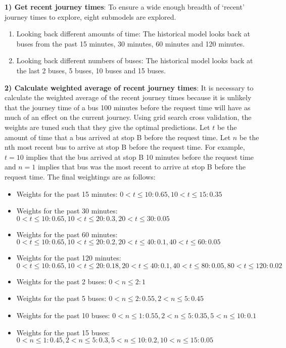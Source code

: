 \textbf{1) Get recent journey times}: To ensure a wide enough breadth of `recent' journey times to explore, eight submodels are explored.

\begin{enumerate}[label=(\alph*)]

\item Looking back different amounts of time: The historical model looks back at buses from the past 15 minutes, 30 minutes, 60 minutes and 120 minutes. 

\item Looking back different numbers of buses: The historical model looks back at the last 2 buses, 5 buses, 10 buses and 15 buses.

\end{enumerate}

\textbf{2) Calculate weighted average of recent journey times}: It is necessary to calculate the weighted average of the recent journey times because it is unlikely that the journey time of a bus 100 minutes before the request time will have as much of an effect on the current journey. Using grid search cross validation, the weights are tuned such that they give the optimal predictions. Let $t$ be the amount of time that a bus arrived at stop B before the request time. Let $n$ be the nth most recent bus to arrive at stop B before the request time. For example, $t = 10$ implies that the bus arrived at stop B 10 minutes before the request time and $n=1$ implies that bus was the most recent to arrive at stop B before the request time. The final weightings are as follows:

\begin{itemize}
    \item Weights for the past 15 minutes: $0 < t \leq 10: 0.65, 10 < t \leq 15: 0.35$
    \item Weights for the past 30 minutes: $0 < t \leq 10: 0.65, 10 < t \leq 20: 0.3, 20 < t \leq 30: 0.05$ 
    \item Weights for the past 60 minutes: $0 < t \leq 10: 0.65, 10 < t \leq 20: 0.2, 20 < t \leq 40: 0.1, 40 < t \leq 60: 0.05$ 
    \item Weights for the past 120 minutes:$0 < t \leq 10: 0.65, 10 < t \leq 20: 0.18, 20 < t \leq 40: 0.1, 40 < t \leq 80: 0.05, 80 < t \leq 120: 0.02$ 
    \item Weights for the past 2 buses: $0 < n \leq 2: 1$
    \item Weights for the past 5 buses: $0 < n \leq 2: 0.55, 2 < n \leq 5: 0.45$
    \item Weights for the past 10 buses: $0 < n \leq 1: 0.55, 2 < n \leq 5: 0.35, 5 < n \leq 10: 0.1$
    \item Weights for the past 15 buses: $0 < n \leq 1: 0.45, 2 < n \leq 5: 0.3, 5 < n \leq 10: 0.2, 10 < n \leq 15: 0.05$
\end{itemize}

